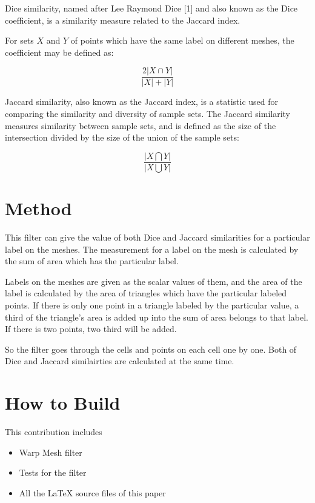 \documentclass{InsightArticle}
\begin{document}
Dice similarity, named after Lee Raymond Dice [1] and also known as the Dice coefficient, 
is a similarity measure related to the Jaccard index.

For sets $X$ and $Y$ of points which have the same label on different meshes, the coefficient
may be defined as: 

\begin{equation}
\frac{2\left | X\cap Y \right |}{\left | X \right |+\left | Y \right |}
\end{equation}

Jaccard similarity, also known as the Jaccard index, is a statistic used for comparing the similarity 
and diversity of sample sets. The Jaccard similarity measures similarity between sample sets, and 
is defined as the size of the intersection divided by the size of the union of the sample sets:

\begin{equation}
\frac{\left | X\bigcap Y \right |}{\left | X\bigcup Y \right |}
\end{equation}

\section{Method}
This filter can give the value of both Dice and Jaccard similarities for a particular label on the meshes.
The measurement for a label on the mesh is calculated by the sum of area which has the particular 
label. 

Labels on the meshes are given as the scalar values of them, and the area of the label is calculated 
by the area of triangles which have the particular labeled points. If there is only one point in a triangle
labeled by the particular value, a third of the triangle's area is added up into the sum of area
belongs to that label. If there is two points, two third will be added.

So the filter goes through the cells and points on each cell one by one. Both of Dice and Jaccard 
similairties are calculated at the same time.
 

\section{How to Build}

This contribution includes

\begin{itemize}
\item Warp Mesh filter
\item Tests for the filter
\item All the LaTeX source files of this paper
\end{itemize}
\end{document}
